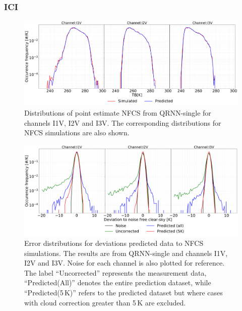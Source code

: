 \documentclass[amt, manuscript]{copernicus}
\begin{document}
\subsubsection{ICI}
%
\begin{figure}[t]
	\includegraphics[width=\textwidth]{Figures/PDF_predictions_ICI.pdf} 
	\caption{Distributions of point estimate NFCS from QRNN-single for channels I1V, I2V and I3V. The corresponding distributions for NFCS simulations are also shown.}
	\label{fig:PDF_predictions}	
\end{figure}
\begin{figure}[t ]
	\includegraphics[width=\textwidth]{Figures/error_distribution_QRNN-single.pdf} 
	\caption{Error distributions for deviations predicted data to NFCS simulations. The results are from QRNN-single and channels I1V, I2V and I3V. Noise for each channel is also plotted for reference. The label ``Uncorrected'' represents the measurement data, ``Predicted(All)'' denotes the entire prediction dataset, while ``Predicted(5\,K)'' refers to the predicted dataset but where cases with cloud correction greater than 5\,K are excluded.}
	\label{fig:error_distributions}	
\end{figure}
\end{document}
